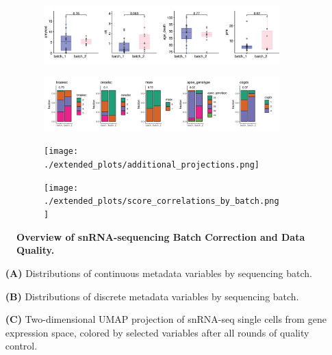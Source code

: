 \begin{figure}[H]
    \begin{subfigure}[t]{\textwidth}
        \caption{}
        \includegraphics[width=\textwidth]{./extended_plots/seq_batch_cont.png}        
    \end{subfigure}
    \begin{subfigure}[t]{\textwidth}
        \caption{}
        \includegraphics[width=\textwidth]{./extended_plots/seq_batch_cat.png}        
    \end{subfigure}  
    \begin{subfigure}[t]{\textwidth}
        \caption{}
        \texttt{[image: ./extended\_plots/additional\_projections.png]}        
    \end{subfigure}   
    \begin{subfigure}[t]{\textwidth}
        \caption{}
        \texttt{[image: ./extended\_plots/score\_correlations\_by\_batch.png]}        
    \end{subfigure}   
    \caption{
        \textbf{Overview of snRNA-sequencing Batch Correction and Data Quality.}\\
    }
    \label{fig:snRNA_quality_annotation}
\end{figure}
\begin{itemize}
    \item[\textbf{(A)}] Distributions of continuous metadata variables by sequencing batch. 
    \item[\textbf{(B)}] Distributions of discrete metadata variables by sequencing batch. 
    \item[\textbf{(C)}] Two-dimensional UMAP projection of snRNA-seq single cells from gene expression space, colored by selected variables after all rounds of quality control. 
\end{itemize}